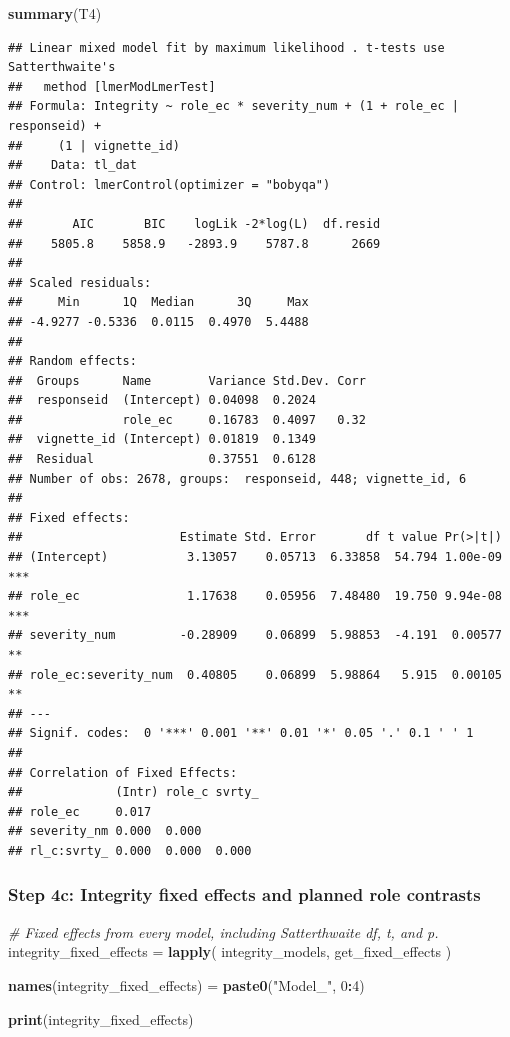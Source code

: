 \documentclass[
]{article}
\newenvironment{Shaded}{\begin{snugshade}}{\end{snugshade}}
\newcommand{\CommentTok}[1]{\textcolor[rgb]{0.56,0.35,0.01}{\textit{#1}}}
\newcommand{\DecValTok}[1]{\textcolor[rgb]{0.00,0.00,0.81}{#1}}
\newcommand{\FunctionTok}[1]{\textcolor[rgb]{0.13,0.29,0.53}{\textbf{#1}}}
\newcommand{\NormalTok}[1]{#1}
\newcommand{\OtherTok}[1]{\textcolor[rgb]{0.56,0.35,0.01}{#1}}
\newcommand{\SpecialCharTok}[1]{\textcolor[rgb]{0.81,0.36,0.00}{\textbf{#1}}}
\newcommand{\StringTok}[1]{\textcolor[rgb]{0.31,0.60,0.02}{#1}}
\begin{document}
\begin{Shaded}
\begin{Highlighting}[]
\FunctionTok{summary}\NormalTok{(T4)}
\end{Highlighting}
\end{Shaded}

\begin{verbatim}
## Linear mixed model fit by maximum likelihood . t-tests use Satterthwaite's
##   method [lmerModLmerTest]
## Formula: Integrity ~ role_ec * severity_num + (1 + role_ec | responseid) +  
##     (1 | vignette_id)
##    Data: tl_dat
## Control: lmerControl(optimizer = "bobyqa")
## 
##       AIC       BIC    logLik -2*log(L)  df.resid 
##    5805.8    5858.9   -2893.9    5787.8      2669 
## 
## Scaled residuals: 
##     Min      1Q  Median      3Q     Max 
## -4.9277 -0.5336  0.0115  0.4970  5.4488 
## 
## Random effects:
##  Groups      Name        Variance Std.Dev. Corr
##  responseid  (Intercept) 0.04098  0.2024       
##              role_ec     0.16783  0.4097   0.32
##  vignette_id (Intercept) 0.01819  0.1349       
##  Residual                0.37551  0.6128       
## Number of obs: 2678, groups:  responseid, 448; vignette_id, 6
## 
## Fixed effects:
##                      Estimate Std. Error       df t value Pr(>|t|)    
## (Intercept)           3.13057    0.05713  6.33858  54.794 1.00e-09 ***
## role_ec               1.17638    0.05956  7.48480  19.750 9.94e-08 ***
## severity_num         -0.28909    0.06899  5.98853  -4.191  0.00577 ** 
## role_ec:severity_num  0.40805    0.06899  5.98864   5.915  0.00105 ** 
## ---
## Signif. codes:  0 '***' 0.001 '**' 0.01 '*' 0.05 '.' 0.1 ' ' 1
## 
## Correlation of Fixed Effects:
##             (Intr) role_c svrty_
## role_ec     0.017               
## severity_nm 0.000  0.000        
## rl_c:svrty_ 0.000  0.000  0.000
\end{verbatim}

\subsubsection{Step 4c: Integrity fixed effects and planned role
contrasts}\label{step-4c-integrity-fixed-effects-and-planned-role-contrasts}

\begin{Shaded}
\begin{Highlighting}[]
\CommentTok{\# Fixed effects from every model, including Satterthwaite df, t, and p.}
\NormalTok{integrity\_fixed\_effects }\OtherTok{=} \FunctionTok{lapply}\NormalTok{(}
\NormalTok{  integrity\_models,}
\NormalTok{  get\_fixed\_effects}
\NormalTok{)}

\FunctionTok{names}\NormalTok{(integrity\_fixed\_effects) }\OtherTok{=} \FunctionTok{paste0}\NormalTok{(}\StringTok{"Model\_"}\NormalTok{, }\DecValTok{0}\SpecialCharTok{:}\DecValTok{4}\NormalTok{)}

\FunctionTok{print}\NormalTok{(integrity\_fixed\_effects)}
\end{Highlighting}
\end{Shaded}
\end{document}
